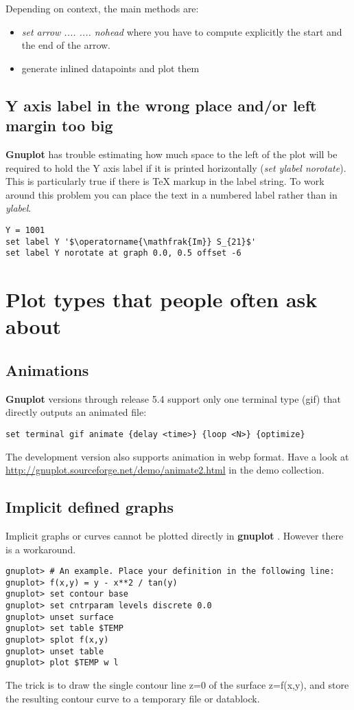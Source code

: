 \documentclass[letter,11pt]{article}
\def\http#1{{\small\href{http://#1}{\url{http://#1}}}}
\newcommand{\http}[1]%
            {\htmladdnormallink{\latex{\url{http://#1}}%
                    \html{\textit{http://#1}}}%
                {http://#1}%
            }
\newcommand{\gnuplot}{\textbf{gnuplot }}
\newcommand{\Gnuplot}{\textbf{Gnuplot }}
\begin{document}
{Depending on context, the main methods are:
\begin{itemize}
\item {\em set arrow .... .... nohead} where you have to compute
explicitly the start and the end of the arrow.
\item generate inlined datapoints and plot them
\end{itemize}

\subsection{Y axis label in the wrong place and/or left margin too big}
\Gnuplot has trouble estimating how much space to the left of the plot
will be required to hold the Y axis label if it is printed horizontally
({\em set ylabel norotate}).  This is particularly true if there is
TeX markup in the label string.  To work around this problem you can place
the text in a numbered label rather than in {\em ylabel}.
\small
\begin{verbatim}
Y = 1001
set label Y '$\operatorname{\mathfrak{Im}} S_{21}$'
set label Y norotate at graph 0.0, 0.5 offset -6
\end{verbatim}
\normalsize

\section{Plot types that people often ask about}

\subsection{Animations}

\Gnuplot versions through release 5.4 support only one terminal type
(gif) that directly outputs an animated file:
\begin{verbatim}
set terminal gif animate {delay <time>} {loop <N>} {optimize}
\end{verbatim}

The development version also supports animation in webp format.
Have a look at
\http{gnuplot.sourceforge.net/demo/animate2.html}
in the demo collection.

\subsection{Implicit defined graphs}

Implicit graphs or curves cannot be plotted directly in \gnuplot.
However there is a workaround.
\small
\begin{verbatim}
gnuplot> # An example. Place your definition in the following line:
gnuplot> f(x,y) = y - x**2 / tan(y)
gnuplot> set contour base
gnuplot> set cntrparam levels discrete 0.0
gnuplot> unset surface
gnuplot> set table $TEMP
gnuplot> splot f(x,y)
gnuplot> unset table
gnuplot> plot $TEMP w l
\end{verbatim}
\normalsize
The trick is to draw the single contour line z=0 of the surface
z=f(x,y), and store the resulting contour curve to a temporary file or datablock.


}
\end{document}
